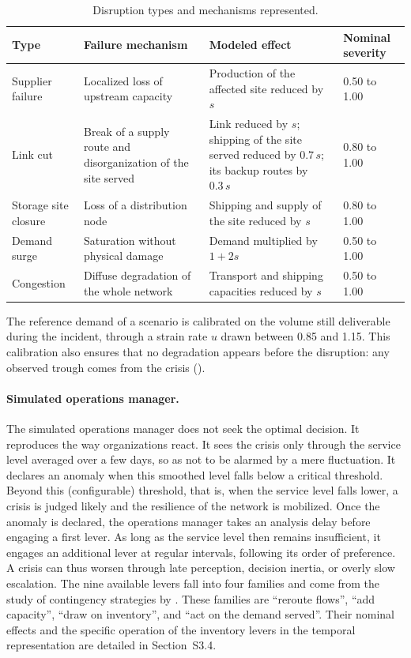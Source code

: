 \begin{table}[htbp]
\caption{Disruption types and mechanisms represented.}
\label{tab:d3}
\footnotesize
\begin{tabularx}{\textwidth}{@{}P{2.4cm}LLP{1.7cm}@{}}
\toprule
\textbf{Type} & \textbf{Failure mechanism} & \textbf{Modeled effect} & \textbf{Nominal severity} \\
\toprule
Supplier failure & Localized loss of upstream capacity & Production of the affected site reduced by $s$ & 0.50 to 1.00 \\
\midrule
Link cut & Break of a supply route and disorganization of the site served & Link reduced by $s$; shipping of the site served reduced by $0.7\,s$; its backup routes by $0.3\,s$ & 0.80 to 1.00 \\
\midrule
Storage site closure & Loss of a distribution node & Shipping and supply of the site reduced by $s$ & 0.80 to 1.00 \\
\midrule
Demand surge & Saturation without physical damage & Demand multiplied by $1 + 2s$ & 0.50 to 1.00 \\
\midrule
Congestion & Diffuse degradation of the whole network & Transport and shipping capacities reduced by $s$ & 0.50 to 1.00 \\
\bottomrule
\end{tabularx}
\end{table}

The reference demand of a scenario is calibrated on the volume still deliverable during the incident, through a strain rate $u$ drawn between 0.85 and 1.15. This calibration also ensures that no degradation appears before the disruption: any observed trough comes from the crisis ().

\paragraph{Simulated operations manager.} The simulated operations manager does not seek the optimal decision. It reproduces the way organizations react. It sees the crisis only through the service level averaged over a few days, so as not to be alarmed by a mere fluctuation. It declares an anomaly when this smoothed level falls below a critical threshold. Beyond this (configurable) threshold, that is, when the service level falls lower, a crisis is judged likely and the resilience of the network is mobilized. Once the anomaly is declared, the operations manager takes an analysis delay before engaging a first lever. As long as the service level then remains insufficient, it engages an additional lever at regular intervals, following its order of preference. A crisis can thus worsen through late perception, decision inertia, or overly slow escalation. The nine available levers fall into four families and come from the study of contingency strategies by \citet{sheffi2005book,ivanov2019ijpr,tomlin2006,chopra2004}. These families are ``reroute flows'', ``add capacity'', ``draw on inventory'', and ``act on the demand served''. Their nominal effects and the specific operation of the inventory levers in the temporal representation are detailed in Section~S3.4.\\

